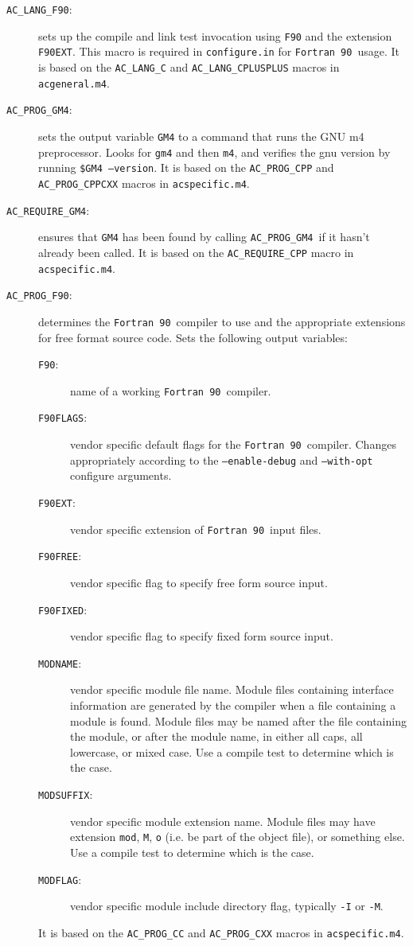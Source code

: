 \documentclass[11pt]{nmemo}
\newcommand{\fninety}{\texttt{Fortran~90}}
\newcommand{\langfninety}{\texttt{AC\_LANG\_F90}}
\newcommand{\progfninety}{\texttt{AC\_PROG\_F90}}
\newcommand{\requiregmfour}{\texttt{AC\_REQUIRE\_GM4}}
\newcommand{\proggmfour}{\texttt{AC\_PROG\_GM4}}
\begin{document}
\begin{description}
\item[\langfninety:] sets up the compile and link test invocation
using \texttt{F90} and the extension \texttt{F90EXT}.  This macro is
required in \texttt{configure.in} for \fninety\ usage.  It is based on
the \texttt{AC\_LANG\_C} and \texttt{AC\_LANG\_CPLUSPLUS} macros in
\texttt{acgeneral.m4}.

\item[\proggmfour:] sets the output variable \texttt{GM4} to a command
that runs the GNU m4 preprocessor.  Looks for \texttt{gm4} and then
\texttt{m4}, and verifies the gnu version by running
\texttt{\${GM4}~--version}.  It is based on the \texttt{AC\_PROG\_CPP}
and \texttt{AC\_PROG\_CPPCXX} macros in \texttt{acspecific.m4}.

\item[\requiregmfour:] ensures that \texttt{GM4} has been found by
calling \proggmfour\ if it hasn't already been called.  It is based on
the \texttt{AC\_REQUIRE\_CPP} macro in \texttt{acspecific.m4}.

\item[\progfninety:] determines the \fninety\ compiler to use and the
appropriate extensions for free format source code.  Sets the
following output variables:
\begin{description}
\item[\texttt{F90}:] name of a working \fninety\ compiler.
\item[\texttt{F90FLAGS}:] vendor specific default flags for the
\fninety\ compiler. 
Changes appropriately according to the \texttt{--enable-debug} and
\texttt{--with-opt} configure arguments.
\item[\texttt{F90EXT}:] vendor specific extension of \fninety\ input files.
\item[\texttt{F90FREE}:] vendor specific flag to specify free form
source input. 
\item[\texttt{F90FIXED}:] vendor specific flag to specify fixed form
source input. 
\item[\texttt{MODNAME}:] vendor specific module file name.  Module
files containing interface information are generated by the compiler
when a file containing a module is found.  Module files may be named
after the file containing the module, or after the module name, in
either all caps, all lowercase, or mixed case.  Use a compile test to
determine which is the case.   
\item[\texttt{MODSUFFIX}:] vendor specific module extension name.
Module files may have extension \texttt{mod}, \texttt{M}, \texttt{o}
(i.e. be part of the object file), or something else.  Use a compile
test to determine which is the case.
\item[\texttt{MODFLAG}:] vendor specific module include directory
flag, typically \texttt{-I} or \texttt{-M}.
\end{description}
It is based on the \texttt{AC\_PROG\_CC} and \texttt{AC\_PROG\_CXX}
macros in \texttt{acspecific.m4}.
\end{description}
\end{document}
